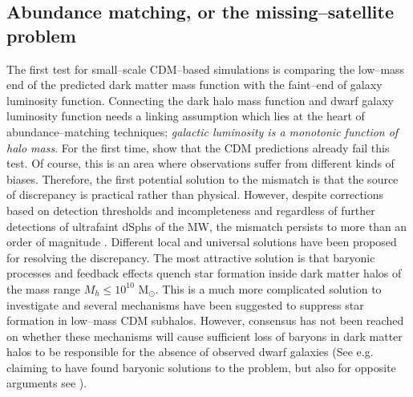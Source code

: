 \documentclass[a4wide,12pt]{book}
\newcommand{\msun }{$\mathrm{M}_{\odot}$}
\begin{document}
{\subsection{Abundance matching, or the missing--satellite problem}
\label{subsec:missing-satellite}
The first test for small--scale CDM--based simulations is comparing the low--mass end of the predicted dark matter mass function with the faint--end of galaxy luminosity function. Connecting the dark halo mass function and dwarf galaxy luminosity function needs a linking assumption which lies at the heart of abundance--matching techniques; \emph{galactic luminosity is a monotonic function of halo mass}. For the first time, \citet[][]{Klypin+1999, Moore+1999} show that the CDM predictions already fail this test. Of course, this is an area where observations suffer from different kinds of biases. Therefore, the first potential solution to the mismatch is that the source of discrepancy is practical rather than physical. However, despite corrections based on detection thresholds and incompleteness and regardless of further detections of ultrafaint dSphs of the MW, the mismatch persists to more than an order of magnitude \citep[See e.g.][]{Pawlowski+2015}. Different local and universal solutions have been proposed for resolving the discrepancy. The most attractive solution is that baryonic processes and feedback effects quench star formation inside dark matter halos of the mass range $M_h \leq 10^{10} $ \msun . This is a much more complicated solution to investigate and several mechanisms have been suggested to suppress star formation in low--mass CDM subhalos. However, consensus has not been reached on whether these mechanisms will cause sufficient loss of baryons in dark matter halos to be responsible for the absence of observed dwarf galaxies (See e.g. \citet{Brooks+2013, Sawala+2014, DelPopolo+2014, Sawala+2015} claiming to have found baryonic solutions to the problem, but also for opposite arguments see \citealt{Bullock+2010, Klypin+2015}).
 
}
\end{document}
